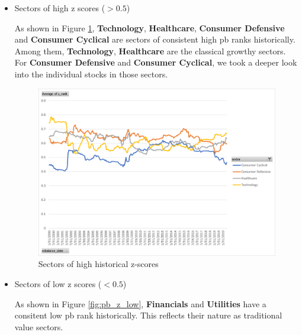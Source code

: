 \documentclass[11pt]{article} %
\begin{document}
\begin{itemize}

\item Sectors of high z scores ($>0.5$)

As shown in Figure \ref{fig:pb_z_high}, \textbf{Technology}, \textbf{Healthcare}, \textbf{Consumer Defensive} and \textbf{Consumer Cyclical} are sectors of consistent high pb ranks historically. Among them,  \textbf{Technology}, \textbf{Healthcare} are the classical growthy sectors. For \textbf{Consumer Defensive} and \textbf{Consumer Cyclical}, we took a deeper look into the individual stocks in those sectors.

\begin{figure}[H]
\centering
\includegraphics[scale=0.7]{pb_z_score_sector_high.png}
\caption{Sectors of high historical z-scores}
\label{fig:pb_z_high}
\end{figure}


\item Sectors of low z scores ($<0.5$)

As shown in Figure \ref{fig:pb_z_low}, \textbf{Financials } and \textbf{Utilities} have a consitent low pb rank historically. This reflects their nature as traditional value sectors.


\end{itemize}
\end{document}

